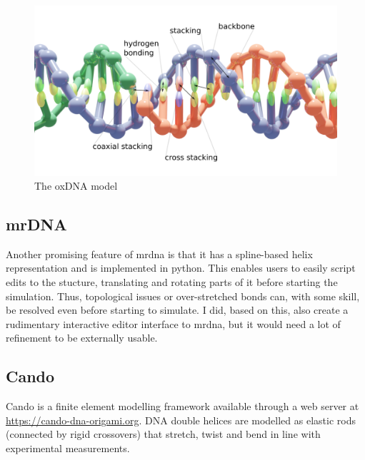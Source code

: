 \begin{figure}[h]
\begin{center}
    \includegraphics[width=\textwidth]{figures/oxdna_annot.png}
    \caption{The oxDNA model}
    \label{fig_oxDNA}
    \end{center}
\end{figure}

\subsection{mrDNA}
Another promising feature of mrdna is that it has a spline-based helix representation and is implemented in python. This enables users to easily script edits to the stucture, translating and rotating parts of it before starting the simulation. Thus, topological issues or over-stretched bonds can, with some skill, be resolved even before starting to simulate. I did, based on this, also create a rudimentary interactive editor interface to mrdna, but it would need a lot of refinement to be externally usable.

\subsection{Cando}

Cando is a finite element modelling framework\cite{kim2012cando} available through a web server at \url{https://cando-dna-origami.org}. DNA double helices are modelled as elastic rods (connected by rigid crossovers) that stretch, twist and bend in line with experimental measurements.